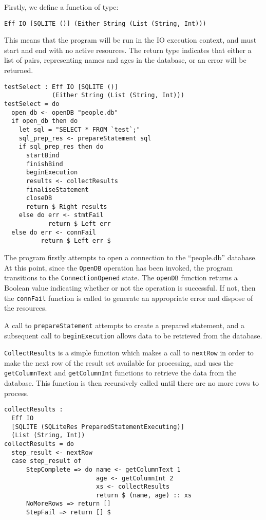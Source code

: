 \documentclass[preprint]{sigplanconf}
\begin{document}
Firstly, we define a function of type:
{\small
\begin{verbatim}
Eff IO [SQLITE ()] (Either String (List (String, Int)))
\end{verbatim}
}
This means that the program will be run in the IO execution context, and must start and end with no active resources. The return type indicates that either a list of  pairs, representing names and ages in the database, or an error will be returned. 
{\small
\begin{verbatim}
testSelect : Eff IO [SQLITE ()] 
             (Either String (List (String, Int)))
testSelect = do
  open_db <- openDB "people.db"
  if open_db then do
    let sql = "SELECT * FROM `test`;"
    sql_prep_res <- prepareStatement sql
    if sql_prep_res then do 
      startBind
      finishBind
      beginExecution
      results <- collectResults
      finaliseStatement
      closeDB
      return $ Right results
    else do err <- stmtFail
            return $ Left err
  else do err <- connFail
          return $ Left err $
\end{verbatim}
}
The program firstly attempts to open a connection to the ``people.db'' database. At this point, since the \texttt{OpenDB} operation has been invoked, the program transitions to the \texttt{ConnectionOpened} state. The \texttt{openDB} function returns a Boolean value indicating whether or not the operation is successful. If not, then the \texttt{connFail} function is called to generate an appropriate error and dispose of the resources.

A call to \texttt{prepareStatement} attempts to create a prepared statement, and a subsequent call to \texttt{beginExecution} allows data to be retrieved from the database.

\texttt{CollectResults} is a simple function which makes a call to \texttt{nextRow} in order to make the next row of the result set available for processing, and uses the \texttt{getColumnText} and \texttt{getColumnInt} functions to retrieve the data from the database. This function is then recursively called until there are no more rows to process.
{\small
\begin{verbatim}
collectResults : 
  Eff IO 
  [SQLITE (SQLiteRes PreparedStatementExecuting)] 
  (List (String, Int))
collectResults = do
  step_result <- nextRow
  case step_result of
      StepComplete => do name <- getColumnText 1
                         age <- getColumnInt 2
                         xs <- collectResults
                         return $ (name, age) :: xs
      NoMoreRows => return []
      StepFail => return [] $
\end{verbatim}
}
\end{document}
